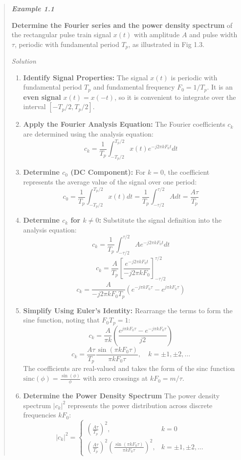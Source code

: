\begin{quote}
\textbf{\emph{Example 1.1}}

\textbf{Determine the Fourier series and the power density spectrum} of
the rectangular pulse train signal \(x(t)\) with amplitude \(A\) and
pulse width \(\tau\), periodic with fundamental period \(T_p\), as
illustrated in Fig 1.3.

\emph{Solution}

\begin{enumerate}
\def\labelenumi{\arabic{enumi}.}
\item
  \textbf{Identify Signal Properties:} The signal \(x(t)\) is periodic
  with fundamental period \(T_p\) and fundamental frequency
  \(F_0 = 1/T_p\). It is an \textbf{even signal} \(x(t) = x(-t)\), so it
  is convenient to integrate over the interval \([-T_p/2, T_p/2]\).
\item
  \textbf{Apply the Fourier Analysis Equation:} The Fourier coefficients
  \(c_k\) are determined using the analysis equation:
  \[c_k = \frac{1}{T_p} \int_{-T_p/2}^{T_p/2} x(t)e^{-j2\pi kF_0t} dt\]
\item
  \textbf{Determine \(c_0\) (DC Component):} For \(k=0\), the
  coefficient represents the average value of the signal over one
  period:
  \[c_0 = \frac{1}{T_p} \int_{-T_p/2}^{T_p/2} x(t) dt = \frac{1}{T_p} \int_{-\tau/2}^{\tau/2} A dt = \frac{A\tau}{T_p}\]
\item
  \textbf{Determine \(c_k\) for \(k \neq 0\):} Substitute the signal
  definition into the analysis equation:
  \[c_k = \frac{1}{T_p} \int_{-\tau/2}^{\tau/2} Ae^{-j2\pi kF_0t} dt\]
  \[c_k = \frac{A}{T_p} \left[ \frac{e^{-j2\pi kF_0t}}{-j2\pi kF_0} \right]_{-\tau/2}^{\tau/2}\]
  \[c_k = \frac{A}{-j2\pi kF_0T_p} (e^{-j\pi kF_0\tau} - e^{j\pi kF_0\tau})\]
\item
  \textbf{Simplify Using Euler's Identity:} Rearrange the terms to form
  the sine function, noting that \(F_0T_p = 1\):
  \[c_k = \frac{A}{\pi k} \left( \frac{e^{j\pi kF_0\tau} - e^{-j\pi kF_0\tau}}{j2} \right)\]
  \[c_k = \frac{A\tau}{T_p} \frac{\sin(\pi kF_0\tau)}{\pi kF_0\tau}, \quad k = \pm 1, \pm 2, \dots\]
  The coefficients are real-valued and takes the form of the sinc
  function \(\text{sinc}(\phi) = \frac{\sin (\phi)}{\phi}\) with zero
  crossings at \(kF_0 = m/\tau\).
\item
  \textbf{Determine the Power Density Spectrum} The power density
  spectrum \(|c_k|^2\) represents the power distribution across discrete
  frequencies \(kF_0\):
  \[|c_k|^2 = \begin{cases} \left( \frac{A\tau}{T_p} \right)^2, & k = 0 \\ \left( \frac{A\tau}{T_p} \right)^2 \left( \frac{\sin(\pi kF_0\tau)}{\pi kF_0\tau} \right)^2, & k = \pm 1, \pm 2, \dots \end{cases}\]
\end{enumerate}
\end{quote}

